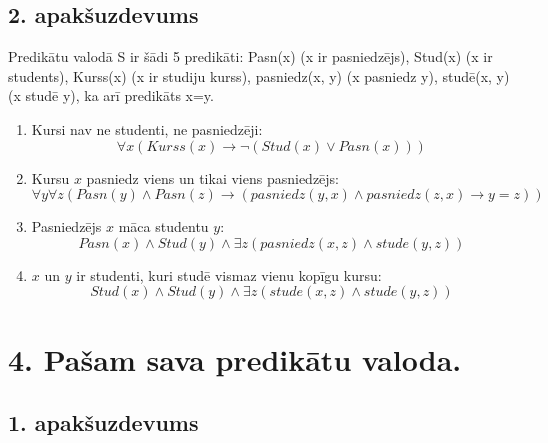 \documentclass{article}
\begin{document}
\subsection*{2. apakšuzdevums}

Predikātu valodā S ir šādi 5 predikāti: Pasn(x) (x ir pasniedzējs), Stud(x) (x ir students),
Kurss(x) (x ir studiju kurss), pasniedz(x, y) (x pasniedz y), studē(x, y) (x studē y), ka arī
predikāts x=y.

\begin{enumerate}
    \item Kursi nav ne studenti, ne pasniedzēji:
          \[
              \forall x (Kurss(x) \rightarrow \neg (Stud(x) \lor Pasn(x)))
          \]

    \item Kursu $x$ pasniedz viens un tikai viens pasniedzējs:
          \[
              \forall y \forall z (Pasn(y) \land Pasn(z) \rightarrow (pasniedz(y, x) \land pasniedz(z, x) \rightarrow y = z))
          \]

    \item Pasniedzējs $x$ māca studentu $y$:
          \[
              Pasn(x) \land Stud(y) \land \exists z (pasniedz(x, z) \land stude(y, z))
          \]

    \item $x$ un $y$ ir studenti, kuri studē vismaz vienu kopīgu kursu:
          \[
              Stud(x) \land Stud(y) \land \exists z (stude(x, z) \land stude(y, z))
          \]
\end{enumerate}

\pagebreak

\section*{4. Pašam sava predikātu valoda.}

\subsection*{1. apakšuzdevums}
\end{document}

